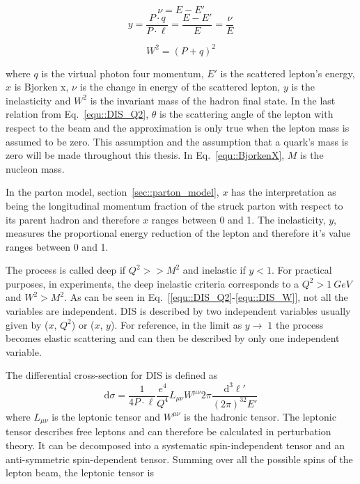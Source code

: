 \begin{multicols}{2}
  \noindent
  \begin{equation}
    \nu = E - E'
  \end{equation} 
  \begin{equation}
    \label{equ::inelasticity}
    y = \frac{P \cdot q}{P \cdot \ell} = \frac{E - E'}{E} = \frac{\nu}{E}
  \end{equation} 
\end{multicols}

\begin{multicols}{2}
  \noindent
  \begin{equation}
    \label{equ::DIS_W}
    W^2 = (P+q)^2
  \end{equation}
\end{multicols}

\noindent
where $q$ is the virtual photon four momentum, $E'$ is the scattered lepton's
energy, $x$ is Bjorken x, $\nu$ is the change in energy of the scattered lepton,
$y$ is the inelasticity and $W^2$ is the invariant mass of the hadron final
state.  In the last relation from Eq.~\ref{equ::DIS_Q2}, $\theta$ is the
scattering angle of the lepton with respect to the beam and the approximation is
only true when the lepton mass is assumed to be zero.  This assumption and the
assumption that a quark's mass is zero will be made throughout this thesis.  In
Eq.~\ref{equ::BjorkenX}, $M$ is the nucleon mass.

In the parton model, section~\ref{sec::parton_model}, $x$ has the interpretation
as being the longitudinal momentum fraction of the struck parton with respect to
its parent hadron and therefore $x$ ranges between 0 and 1.  The inelasticity,
$y$, measures the proportional energy reduction of the lepton and therefore it's
value ranges between 0 and 1.

The process is called deep if $Q^2 >> M^2$ and inelastic if $y < 1$.  For
practical purposes, in experiments, the deep inelastic criteria corresponds to a
$Q^2 > 1~GeV$ and $W^2 > M^2$.  As can be seen in
Eq.~[\ref{equ::DIS_Q2}-\ref{equ::DIS_W}], not all the variables are independent.
DIS is described by two independent variables usually given by ($x$, $Q^2$) or
($x$, $y$).  For reference, in the limit as $y \to \; 1$ the process becomes
elastic scattering and can then be described by only one independent variable.

The differential cross-section for DIS is defined as~\cite{Barone:2001sp}
\begin{equation}
  \label{equ::DIS_xsection}
  \mathrm{d}\sigma =
  \frac{1}{4P\cdot \ell}\frac{e^4}{Q^4} L_{\mu\nu}W^{\mu\nu}
  2\pi\frac{\mathrm{d}^3\ell'}{(2\pi)^32E'}
\end{equation}
\noindent
where $L_{\mu\nu}$ is the leptonic tensor and $W^{\mu\nu}$ is the hadronic
tensor.  The leptonic tensor describes free leptons and can therefore be
calculated in perturbation theory.  It can be decomposed into a systematic
spin-independent tensor and an anti-symmetric spin-dependent tensor.  Summing
over all the possible spins of the lepton beam, the leptonic tensor is

